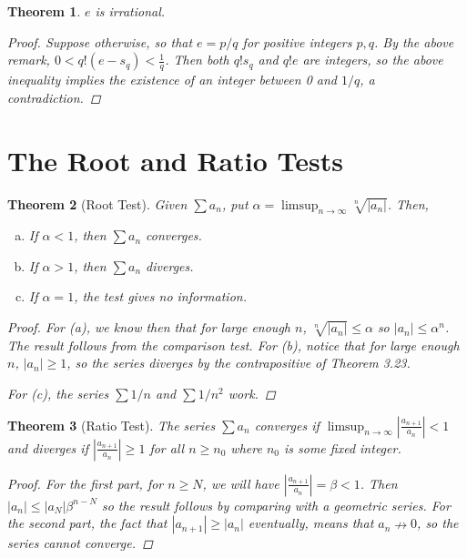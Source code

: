 \documentclass{scrbook}
\renewcommand{\to}{\rightarrow}
\newcommand{\nto}{\nrightarrow}
\newtheorem{theorem}{Theorem}
\begin{document}
\begin{theorem} %
$e$ is irrational.

\begin{proof}
Suppose otherwise, so that $e = p/q$ for positive integers $p, q$. By the above remark, $0 < q!(e - s_q) < \frac{1}{q}$. Then both $q!s_q$ and $q!e$ are integers, so the above inequality implies the existence of an integer between 0 and $1/q$, a contradiction.
\end{proof}
\end{theorem}

\section{The Root and Ratio Tests}

\begin{theorem}[Root Test] %
Given $\sum a_n$, put $\alpha = \limsup_{n \to \infty} \sqrt[n]{|a_n|}$. Then,
\begin{enumerate}[(a)]
\item If $\alpha < 1$, then $\sum a_n$ converges.
\item If $\alpha > 1$, then $\sum a_n$ diverges.
\item If $\alpha = 1$, the test gives no information.
\end{enumerate}

\begin{proof}
For (a), we know then that for large enough $n$, $\sqrt[n]{|a_n|} \le \alpha$ so $|a_n| \le \alpha^n$. The result follows from the comparison test. For (b), notice that for large enough $n$, $|a_n| \ge 1$, so the series diverges by the contrapositive of Theorem 3.23.

For (c), the series $\sum 1/n$ and $\sum 1/n^2$ work.
\end{proof}
\end{theorem}

\begin{theorem}[Ratio Test] %
The series $\sum a_n$ converges if $\limsup_{n \to \infty} \left| \frac{a_{n+1}}{a_n}\right| < 1$ and diverges if $\left|\frac{a_{n+1}}{a_n}\right| \ge 1$ for all $n \ge n_0$ where $n_0$ is some fixed integer.

\begin{proof}
For the first part, for $n \ge N$, we will have $\left|\frac{a_{n+1}}{a_n}\right| = \beta < 1$. Then $|a_n| \le |a_N| \beta^{n-N}$ so the result follows by comparing with a geometric series. For the second part, the fact that $|a_{n+1}| \ge |a_n|$ eventually, means that $a_n \nto 0$, so the series cannot converge.
\end{proof}
\end{theorem}
\end{document}
